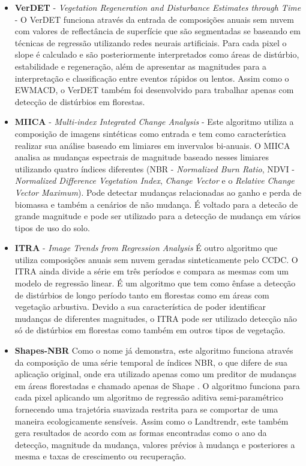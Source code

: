 \documentclass[12pt,a4paper]{article}
\begin{document}
\begin{itemize}
  \item \textbf{VerDET} - \textit{Vegetation Regeneration and Disturbance Estimates through Time} \citep{Hughes2017} - O VerDET funciona através da entrada de composições anuais sem nuvem com valores de reflectância de superfície que são segmentadas se baseando em técnicas de regressão utilizando redes neurais artificiais. Para cada pixel o slope é calculado e são posteriormente interpretados como áreas de distúrbio, estabilidade e regeneração, além de apresentar as magnitudes para a interpretação e classificação entre eventos rápidos ou lentos. Assim como o EWMACD, o VerDET também foi desenvolvido para trabalhar apenas com detecção de distúrbios em florestas.
  
  \item \textbf{MIICA} - \textit{Multi-index Integrated Change Analysis} \citep{JIN2013159} - Este algoritmo utiliza a composição de imagens sintéticas como entrada e tem como característica realizar sua análise baseado em limiares em invervalos bi-anuais. O MIICA analisa as mudanças espectrais de magnitude baseado nesses limiares utilizando quatro índices diferentes (NBR - \textit{Normalized Burn Ratio}, NDVI - \textit{Normalized Difference Vegetation Index}, \textit{Change Vector} e o \textit{Relative Change Vector Maximum}). Pode detectar mudanças relacionadas ao ganho e perda de biomassa e também a cenários de não mudança. É voltado para a detecão de grande magnitude e pode ser utilizado para a detecção de mudança em vários tipos de uso do solo.
  
  \item \textbf{ITRA} - \textit{Image Trends from Regression Analysis} \citep{VOGELMANN201292} É outro algoritmo que utiliza composições anuais sem nuvem geradas sinteticamente pelo CCDC. O ITRA ainda divide a série em três períodos e compara as mesmas com um modelo de regressão linear. É um algoritmo que tem como ênfase a detecção de distúrbios de longo período tanto em florestas como em áreas com vegetação arbustiva. Devido a sua característica de poder identificar mudanças de diferentes magnitudes, o ITRA pode ser utilizado detecção não só de distúrbios em florestas como também em outros tipos de vegetação.
  
  \item \textbf{Shapes-NBR} \citep{Meyer2013, Moisen2016} Como o nome já demonstra, este algoritmo funciona através da composição de uma série temporal de índices NBR, o que difere de sua aplicação original, onde era utilizado apenas como um preditor de mudanças em áreas florestadas e chamado apenas de Shape \citep{SCHROEDER2017230}. O algoritmo funciona para cada pixel aplicando um algoritmo de regressão aditiva semi-paramétrico fornecendo uma trajetória suavizada restrita para se comportar de uma maneira ecologicamente sensíveis. Assim como o Landtrendr, este também gera resultados de acordo com as formas encontradas como o ano da detecção, magnitude da mudança, valores prévios à mudança e posteriores a mesma e taxas de crescimento ou recuperação.
  
\end{itemize}
\end{document}
